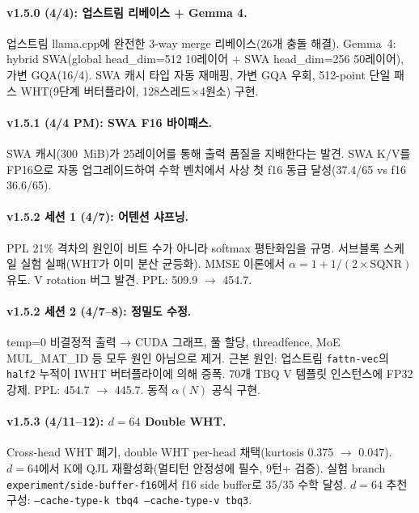 \documentclass[10pt,twocolumn]{article}
\begin{document}
\paragraph{v1.5.0 (4/4): 업스트림 리베이스 + Gemma 4.}
업스트림 llama.cpp에 완전한 3-way merge 리베이스(26개 충돌 해결). Gemma~4: hybrid SWA(global head\_dim=512 10레이어 + SWA head\_dim=256 50레이어), 가변 GQA(16/4). SWA 캐시 타입 자동 재매핑, 가변 GQA 우회, 512-point 단일 패스 WHT(9단계 버터플라이, 128스레드$\times$4원소) 구현.

\paragraph{v1.5.1 (4/4 PM): SWA F16 바이패스.}
SWA 캐시(300~MiB)가 25레이어를 통해 출력 품질을 지배한다는 발견. SWA K/V를 FP16으로 자동 업그레이드하여 수학 벤치에서 사상 첫 f16 동급 달성(37.4/65 vs f16 36.6/65).

\paragraph{v1.5.2 세션 1 (4/7): 어텐션 샤프닝.}
PPL 21\% 격차의 원인이 비트 수가 아니라 softmax 평탄화임을 규명. 서브블록 스케일 실험 실패(WHT가 이미 분산 균등화). MMSE 이론에서 $\alpha = 1 + 1/(2 \times \text{SQNR})$ 유도. V rotation 버그 발견. PPL: 509.9 $\to$ 454.7.

\paragraph{v1.5.2 세션 2 (4/7--8): 정밀도 수정.}
temp=0 비결정적 출력 → CUDA 그래프, 풀 할당, threadfence, MoE MUL\_MAT\_ID 등 모두 원인 아님으로 제거. 근본 원인: 업스트림 \texttt{fattn-vec}의 \texttt{half2} 누적이 IWHT 버터플라이에 의해 증폭. 70개 TBQ V 템플릿 인스턴스에 FP32 강제. PPL: 454.7 $\to$ 445.7. 동적 $\alpha(N)$ 공식 구현.

\paragraph{v1.5.3 (4/11--12): $d=64$ Double WHT.}
Cross-head WHT 폐기, double WHT per-head 채택(kurtosis 0.375 $\to$ 0.047). $d=64$에서 K에 QJL 재활성화(멀티턴 안정성에 필수, 9턴+ 검증). 실험 branch \texttt{experiment/side-buffer-f16}에서 f16 side buffer로 35/35 수학 달성. $d=64$ 추천 구성: \texttt{--cache-type-k tbq4 --cache-type-v tbq3}.
\end{document}
